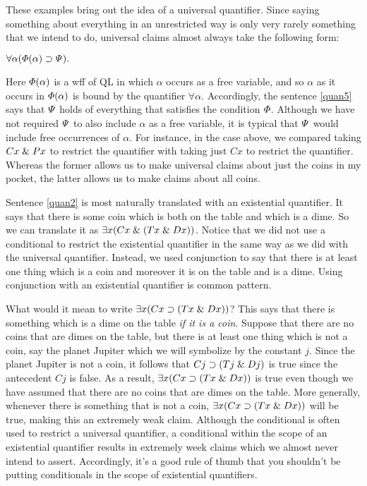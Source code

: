 These examples bring out the idea of  a universal quantifier.
Since saying something about everything in an unrestricted way is only very rarely something that we intend to do, universal claims almost always take the following form:

\begin{earg}
\item[\ex{quan5}] $\forall\alpha(\varPhi(\alpha) \supset \varPsi).$ 
\end{earg}

Here $\varPhi(\alpha)$ is a wff of QL in which $\alpha$ occurs as a free variable, and so $\alpha$ as it occurs in $\varPhi(\alpha)$ is bound by the quantifier $\forall\alpha$.
Accordingly, the sentence \ref{quan5} says that $\varPsi$ holds of everything that satisfies the condition $\varPhi$.
Although we have not required $\varPsi$ to also include $\alpha$ as a free variable, it is typical that $\varPsi$ would include free occurrences of $\alpha$.
For instance, in the case above, we compared taking $Cx \mathrel\& Px$ to restrict the quantifier with taking just $Cx$ to restrict the quantifier. 
Whereas the former allows us to make universal claims about just the coins in my pocket, the latter allows us to make claims about all coins.

Sentence \ref{quan2} is most naturally translated with an existential quantifier.
It says that there is some coin which is both on the table and which is a dime.
So we can translate it as $\exists x(Cx \mathrel\& (Tx \mathrel\& Dx))$.
Notice that we did not use a conditional to restrict the existential quantifier in the same way as we did with the universal quantifier.
Instead, we used conjunction to say that there is at least one thing which is a coin and moreover it is on the table and is a dime.
Using conjunction with an existential quantifier is common pattern.

What would it mean to write $\exists x(Cx \supset (Tx \mathrel\& Dx))$?
This says that there is something which is a dime on the table \textit{if it is a coin}.
Suppose that there are no coins that are dimes on the table, but there is at least one thing which is not a coin, say the planet Jupiter which we will symbolize by the constant $j$.
Since the planet Jupiter is not a coin, it follows that $Cj \supset (Tj \mathrel\& Dj)$ is true since the antecedent $Cj$ is false. 
As a result, $\exists x(Cx \supset (Tx \mathrel\& Dx))$ is true even though we have assumed that there are no coins that are dimes on the table.
More generally, whenever there is something that is not a coin, $\exists x(Cx \supset (Tx \mathrel\& Dx))$ will be true, making this an extremely weak claim.
Although the conditional is often used to restrict a universal quantifier, a conditional within the scope of an existential quantifier results in extremely week claims which we almost never intend to assert.
Accordingly, it's a good rule of thumb that you shouldn't be putting conditionals in the scope of existential quantifiers.


